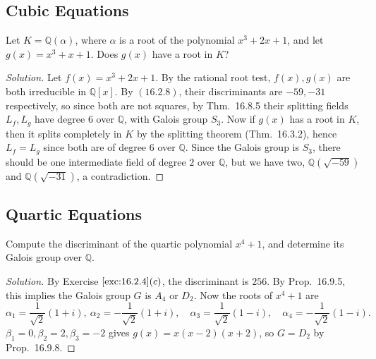 \documentclass[12pt]{article}
\theoremstyle{remark}
\begin{document}
\subsection{Cubic Equations}
\setcounter{subsubsection}{3}
\begin{problem}
  Let $K = \mathbb{Q}(\alpha)$, where $\alpha$ is a root of the polynomial $x^3+2x+1$, and let $g(x) = x^3 + x + 1$. Does $g(x)$ have a root in $K$?
\end{problem}
\begin{proof}[Solution]
  Let $f(x) = x^3+2x+1$. By the rational root test, $f(x),g(x)$ are both irreducible in $\mathbb{Q}[x]$. By $(16.2.8)$, their discriminants are $-59,-31$ respectively, so since both are not squares, by Thm.~16.8.5 their splitting fields $L_f,L_g$ have degree $6$ over $\mathbb{Q}$, with Galois group $S_3$. Now if $g(x)$ has a root in $K$, then it splits completely in $K$ by the splitting theorem (Thm.~16.3.2), hence $L_f = L_g$ since both are of degree $6$ over $\mathbb{Q}$. Since the Galois group is $S_3$, there should be one intermediate field of degree $2$ over $\mathbb{Q}$, but we have two, $\mathbb{Q}(\sqrt{-59})$ and $\mathbb{Q}(\sqrt{-31})$, a contradiction.
\end{proof}
\subsection{Quartic Equations}
\setcounter{subsubsection}{5}
\begin{problem}
  Compute the discriminant of the quartic polynomial $x^4+1$, and determine its Galois group over $\mathbb{Q}$.
\end{problem}
\begin{proof}[Solution]
  By Exercise $\ref{exc:16.2.4}(c)$, the discriminant is $256$. By Prop.~16.9.5, this implies the Galois group $G$ is $A_4$ or $D_2$. Now the roots of $x^4+1$ are
  \begin{equation*}
    \alpha_1 = \frac{1}{\sqrt{2}} (1 + i), ~ \alpha_2 = -\frac{1}{\sqrt{2}} (1 + i), \quad \alpha_3 = \frac{1}{\sqrt{2}} (1 - i), \quad \alpha_4 = -\frac{1}{\sqrt{2}} (1 - i).
  \end{equation*}
  $\beta_1 = 0, \beta_2 = 2, \beta_3 = -2$ gives $g(x) = x(x-2)(x+2)$, so $G = D_2$ by Prop.~16.9.8.
\end{proof}
\end{document}
